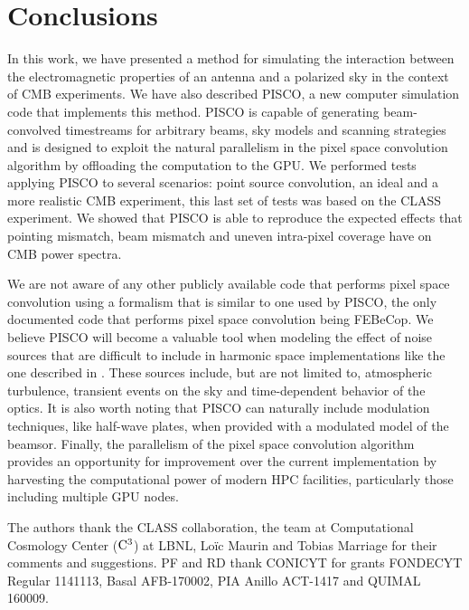 \documentclass[a4paper,11pt]{article}
\begin{document}
\section{Conclusions}
\label{sec::conclusions}

In this work, we have presented a method for simulating the interaction between the electromagnetic properties of an antenna and a polarized sky in the context of CMB experiments. We have also described PISCO, a new computer simulation code that implements this method. PISCO is capable of generating beam-convolved timestreams for arbitrary beams, sky models and scanning strategies and is designed to exploit the natural parallelism in the pixel space convolution algorithm by offloading the computation to the GPU. We performed tests applying PISCO to several scenarios: point source convolution, an ideal and a more realistic CMB experiment, this last set of tests was based on the CLASS experiment. We showed that PISCO is able to reproduce the expected effects that pointing mismatch, beam mismatch and uneven intra-pixel coverage have on CMB power spectra. 

We are not aware of any other publicly available code that performs pixel space convolution using a formalism that is similar to one used by PISCO, the only documented code that performs pixel space convolution being FEBeCop. We believe PISCO will become a valuable tool when modeling the effect of noise sources that are difficult to include in harmonic space implementations like the one described in \cite{2018arXiv180905034D}. These sources include, but are not limited to, atmospheric turbulence, transient events on the sky and time-dependent behavior of the optics. It is also worth noting that PISCO can naturally include modulation techniques, like half-wave plates, when provided with a modulated model of the beamsor. Finally, the parallelism of the pixel space convolution algorithm provides an opportunity for improvement over the current implementation by harvesting the computational power of modern HPC facilities, particularly those including multiple GPU nodes.

\acknowledgments

The authors thank the CLASS collaboration, the team at Computational Cosmology Center ($\rm{C}^3$) at LBNL, Lo\"ic Maurin and Tobias Marriage for their comments and suggestions. PF and RD thank CONICYT for grants FONDECYT Regular 1141113, Basal AFB-170002, PIA Anillo ACT-1417 and QUIMAL 160009.



\end{document}

